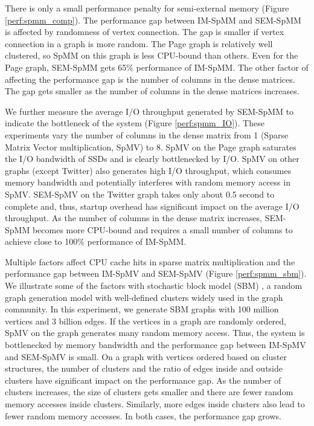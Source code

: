 There is only a small performance penalty for semi-external memory (Figure
\ref{perf:spmm_comp}). The performance gap between IM-SpMM and SEM-SpMM
is affected by randomness of vertex connection. The gap is smaller if
vertex connection in a graph is more random. The Page graph is relatively
well clustered, so SpMM on this graph is less CPU-bound than others.
Even for the Page graph, SEM-SpMM gets 65\% performance of IM-SpMM.
The other factor of affecting the performance gap is the number of columns
in the dense matrices. The gap gets smaller as the number of columns in
the dense matrices increases.

We further measure the average I/O throughput generated by SEM-SpMM to indicate
the bottleneck of the system (Figure \ref{perf:spmm_IO}).   These experiments vary 
the number of columns in the dense matrix from 1 (Sparse Matrix Vector multiplication, SpMV) 
to 8.  SpMV on the Page
graph saturates the I/O bandwidth of SSDs and is clearly bottlenecked by I/O.
SpMV on other graphs (except Twitter) also generates high I/O throughput,
which consumes memory bandwidth and potentially interferes with random memory
access in SpMV. SEM-SpMV on the Twitter graph takes only about 0.5 second to
complete and,
thus, startup overhead has significant impact on the average I/O throughput.
As the number of columns in the dense matrix increases, SEM-SpMM becomes more
CPU-bound and requires a small number of columns to achieve close to 100\%
performance of IM-SpMM.

Multiple factors affect CPU cache hits in sparse matrix multiplication and
the performance gap between IM-SpMV and SEM-SpMV (Figure \ref{perf:spmm_sbm}).
We illustrate some of the factors with stochastic block model (SBM)
\cite{sussman12}, a random graph generation model with well-defined clusters
widely used in the graph community. In this experiment, we
generate SBM graphs with 100 million vertices and 3 billion edges.
If the vertices in a graph are randomly ordered,
SpMV on the graph generates many random memory access. Thus, the system is
bottlenecked by memory bandwidth and the performance gap between IM-SpMV and SEM-SpMV is small. 
On a graph with vertices ordered based on cluster structures, 
the number of clusters and
the ratio of edges inside and outside clusters have significant impact on
the performance gap.
As the number of clusters increases, the size of clusters gets smaller and
there are fewer random memory accesses inside clusters. Similarly, more
edges inside clusters also lead to fewer random memory accesses.
In both cases, the performance gap grows.

